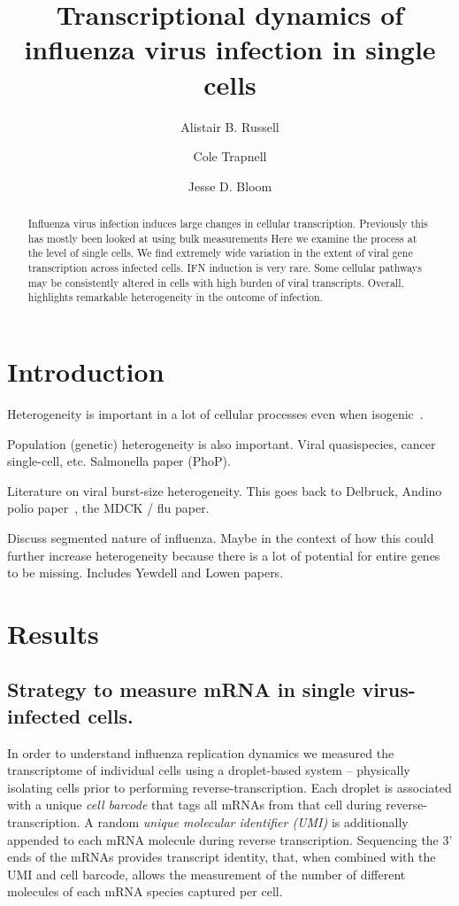 \documentclass[9pt,lineno]{elife}
\title{Transcriptional dynamics of influenza virus infection in single cells}
\author[1]{Alistair B. Russell}
\author[2]{Cole Trapnell}
\author[1,2*]{Jesse D. Bloom}
\affil[1]{Basic Sciences Division and Computational Biology Program, Fred Hutchinson Cancer Research Center, Seattle, United States}
\affil[2]{Department of Genome Sciences, University of Washington, Seattle, United States}
\begin{document}
\maketitle

\begin{abstract}
Influenza virus infection induces large changes in cellular transcription.
Previously this has mostly been looked at using bulk measurements
Here we examine the process at the level of single cells.
We find extremely wide variation in the extent of viral gene transcription across infected cells.
IFN induction is very rare.
Some cellular pathways may be consistently altered in cells with high burden of viral transcripts.
Overall, highlights remarkable heterogeneity in the outcome of infection.
\end{abstract}


\section{Introduction}

Heterogeneity is important in a lot of cellular processes even when isogenic~\citep{shalek2013single,shalek2014single}.

Population (genetic) heterogeneity is also important. 
Viral quasispecies, cancer single-cell, etc.
Salmonella paper (PhoP).

Literature on viral burst-size heterogeneity.
This goes back to Delbruck, Andino polio paper~\citep{schulte2014single}, the MDCK / flu paper.

Discuss segmented nature of influenza.
Maybe in the context of how this could further increase heterogeneity because there is a lot of potential for entire genes to be missing.
Includes Yewdell and Lowen papers.

\section{Results}

\subsection{Strategy to measure mRNA in single virus-infected cells.}
In order to understand influenza replication dynamics we measured the transcriptome of individual cells using a droplet-based system -- physically isolating cells prior to performing reverse-transcription.
Each droplet is associated with a unique \emph{cell barcode} that tags all mRNAs from that cell during reverse-transcription.
A random \emph{unique molecular identifier (UMI)} is additionally appended to each mRNA molecule during reverse transcription.
Sequencing the 3' ends of the mRNAs provides transcript identity, that, when combined with the UMI and cell barcode, allows the measurement of the number of different molecules of each mRNA species captured per cell.
\end{document}
